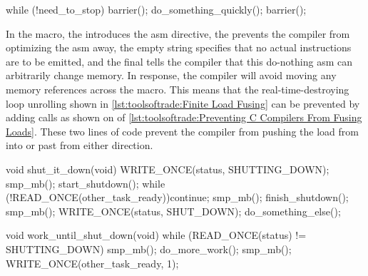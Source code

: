 \begin{listing}
\begin{fcvlabel}
\begin{VerbatimL}[commandchars=\\\[\]]
while (!need_to_stop) {
	barrier(); \lnlbl[b1]
	do_something_quickly();
	barrier(); \lnlbl[b2]
}
\end{VerbatimL}
\end{fcvlabel}
\caption{Preventing C Compilers From Fusing Loads}
\label{lst:toolsoftrade:Preventing C Compilers From Fusing Loads}
\end{listing}

In the  macro, the  introduces the asm
directive, the  prevents the compiler from optimizing
the asm away, the empty string specifies that no actual instructions
are to be emitted, and the final  tells the compiler that
this do-nothing asm can arbitrarily change memory.
In response, the compiler will avoid moving any memory references across
the  macro.
This means that the real-time-destroying loop unrolling shown in
\cref{lst:toolsoftrade:Finite Load Fusing}
can be prevented by adding  calls as shown on
of
\cref{lst:toolsoftrade:Preventing C Compilers From Fusing Loads}.
These two lines of code prevent the compiler from pushing the load from
 into or past  from either
direction.

\begin{listing}
\begin{fcvlabel}
\begin{VerbatimL}[commandchars=\\\[\]]
void shut_it_down(void)
{
	WRITE_ONCE(status, SHUTTING_DOWN);
	smp_mb(); \lnlbl[mb1]
	start_shutdown();
	while (!READ_ONCE(other_task_ready))\lnlbl[loop:b]
		continue;
	smp_mb(); \lnlbl[mb2]
	finish_shutdown();
	smp_mb(); \lnlbl[mb3]
	WRITE_ONCE(status, SHUT_DOWN);
	do_something_else();
}

void work_until_shut_down(void)
{
	while (READ_ONCE(status) != SHUTTING_DOWN) {
		smp_mb(); \lnlbl[mb4]
		do_more_work();
	}
	smp_mb(); \lnlbl[mb5]
	WRITE_ONCE(other_task_ready, 1);
}
\end{VerbatimL}
\end{fcvlabel}
\caption{Preventing Reordering}
\label{lst:toolsoftrade:Preventing Reordering}
\end{listing}

